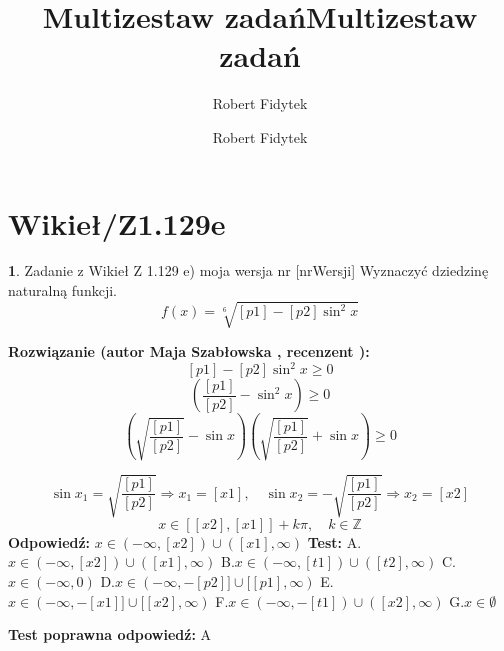 \documentclass[12pt, a4paper]{article}
\title{Multizestaw zadań}
\author{Robert Fidytek}
\date{}\documentclass[12pt, a4paper]{article}
\title{Multizestaw zadań}
\author{Robert Fidytek}
\date{}
\theoremstyle{definition} %
\newtheorem{zad}{}
\theoremstyle{definition} %
\newtheorem{zad}{}
\newcommand{\kategoria}[1]{\section{#1}} %
\newcommand{\zadStart}[1]{\begin{zad}#1\newline} %
\newcommand{\zadStop}{\end{zad}}   %
\newcommand{\rozwStart}[2]{\noindent \textbf{Rozwiązanie (autor #1 , recenzent #2): }\newline} %
\newcommand{\rozwStop}{\newline}                                            %
\newcommand{\odpStart}{\noindent \textbf{Odpowiedź:}\newline}    %
\newcommand{\odpStop}{\newline}                                             %
\newcommand{\testStart}{\noindent \textbf{Test:}\newline} %
\newcommand{\testStop}{\newline} %
\newcommand{\kluczStart}{\noindent \textbf{Test poprawna odpowiedź:}\newline} %
\newcommand{\kluczStop}{\newline} %
\begin{document}
\maketitle


\kategoria{Wikieł/Z1.129e}
\zadStart{Zadanie z Wikieł Z 1.129 e) moja wersja nr [nrWersji]}
Wyznaczyć dziedzinę naturalną funkcji.
$$f(x)=\sqrt[6]{[p1]-[p2]\sin^{2}x}$$

\zadStop

\rozwStart{Maja Szabłowska}{}
$$[p1]-[p2]\sin^{2}x\geq 0$$
$$\left(\frac{[p1]}{[p2]}-\sin^{2} x\right)\geq 0$$
$$\left(\sqrt{\frac{[p1]}{[p2]}}-\sin x\right)\left(\sqrt{\frac{[p1]}{[p2]}}+\sin x\right)\geq 0$$

$$\sin x_{1} =\sqrt{\frac{[p1]}{[p2]}} \Rightarrow x_{1}=[x1], \quad \sin x_{2}=-\sqrt{\frac{[p1]}{[p2]}} \Rightarrow x_{2}=[x2]$$
$$x\in[[x2],[x1]]+k\pi, \quad k\in\mathbb{Z}$$
\rozwStop
\odpStart
$x\in(-\infty,[x2])\cup([x1],\infty)$
\odpStop
\testStart
A.$x\in(-\infty,[x2])\cup([x1],\infty)$
B.$x\in(-\infty,[t1])\cup([t2],\infty)$
C.$x\in(-\infty, 0)$
D.$x\in(-\infty, -[p2]] \cup [[p1],\infty)$
E.$x\in(-\infty, -[x1]] \cup [[x2],\infty)$
F.$x\in(-\infty, -[t1]) \cup ([x2],\infty)$
G.$x\in\emptyset$

\testStop
\kluczStart
A
\kluczStop
\end{document}
